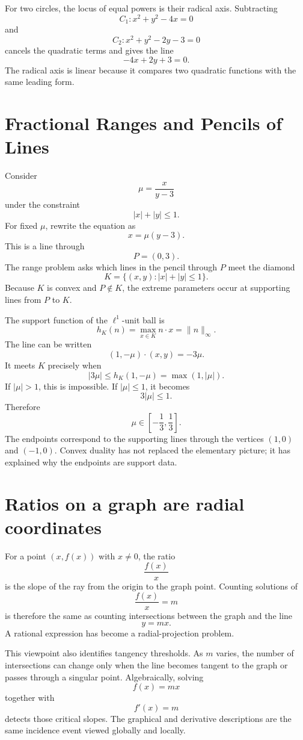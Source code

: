For two circles, the locus of equal powers is their radical axis.  Subtracting
\[
  C_1:x^2+y^2-4x=0
\]
and
\[
  C_2:x^2+y^2-2y-3=0
\]
cancels the quadratic terms and gives the line
\[
  -4x+2y+3=0.
\]
The radical axis is linear because it compares two quadratic functions with the same leading form.

\section{Fractional Ranges and Pencils of Lines}

Consider
\[
  \mu=\frac{x}{y-3}
\]
under the constraint
\[
  |x|+|y|\le1.
\]
For fixed \(\mu\), rewrite the equation as
\[
  x=\mu(y-3).
\]
This is a line through
\[
  P=(0,3).
\]
The range problem asks which lines in the pencil through \(P\) meet the diamond
\[
  K=\{(x,y):|x|+|y|\le1\}.
\]
Because \(K\) is convex and \(P\notin K\), the extreme parameters occur at supporting lines from \(P\) to \(K\).

The support function of the \(\ell^1\)-unit ball is
\[
  h_K(n)=\max_{x\in K}n\cdot x=\|n\|_\infty.
\]
The line can be written
\[
  (1,-\mu)\cdot(x,y)=-3\mu.
\]
It meets \(K\) precisely when
\[
  |3\mu|\le h_K(1,-\mu)=\max(1,|\mu|).
\]
If \(|\mu|>1\), this is impossible.  If \(|\mu|\le1\), it becomes
\[
  3|\mu|\le1.
\]
Therefore
\[
  \boxed{
  \mu\in\left[-\frac13,\frac13\right].}
\]
The endpoints correspond to the supporting lines through the vertices \((1,0)\) and \((-1,0)\).  Convex duality has not replaced the elementary picture; it has explained why the endpoints are support data.

\section{Ratios on a graph are radial coordinates}

For a point \((x,f(x))\) with \(x\ne0\), the ratio
\[
  \frac{f(x)}x
\]
is the slope of the ray from the origin to the graph point.  Counting solutions of
\[
  \frac{f(x)}x=m
\]
is therefore the same as counting intersections between the graph and the line
\[
  y=mx.
\]
A rational expression has become a radial-projection problem.

This viewpoint also identifies tangency thresholds.  As \(m\) varies, the number of intersections can change only when the line becomes tangent to the graph or passes through a singular point.  Algebraically, solving
\[
  f(x)=mx
\]
together with
\[
  f'(x)=m
\]
detects those critical slopes.  The graphical and derivative descriptions are the same incidence event viewed globally and locally.


